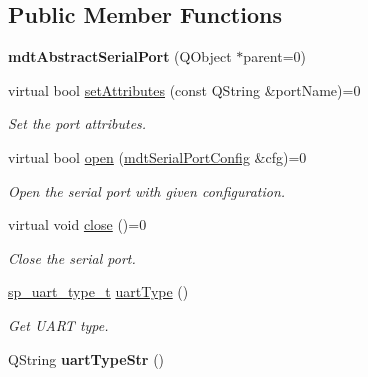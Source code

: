 \subsection*{Public Member Functions}
\begin{DoxyCompactItemize}
\item 
\hypertarget{classmdt_abstract_serial_port_ae379b6151edebc1518e81ec061e379db}{
{\bfseries mdtAbstractSerialPort} (QObject $\ast$parent=0)}
\label{classmdt_abstract_serial_port_ae379b6151edebc1518e81ec061e379db}

\item 
virtual bool \hyperlink{classmdt_abstract_serial_port_ae1be8d8778a7638649d5bb27a73297ef}{setAttributes} (const QString \&portName)=0
\begin{DoxyCompactList}\small\item\em Set the port attributes. \end{DoxyCompactList}\item 
virtual bool \hyperlink{classmdt_abstract_serial_port_ad96a99c370c87d7e4a8b47f98cc7ce35}{open} (\hyperlink{classmdt_serial_port_config}{mdtSerialPortConfig} \&cfg)=0
\begin{DoxyCompactList}\small\item\em Open the serial port with given configuration. \end{DoxyCompactList}\item 
virtual void \hyperlink{classmdt_abstract_serial_port_ad84810a4bd7a10c5c621475511196c85}{close} ()=0
\begin{DoxyCompactList}\small\item\em Close the serial port. \end{DoxyCompactList}\item 
\hypertarget{classmdt_abstract_serial_port_a6b153155d9e110336d51ec48d2cee203}{
\hyperlink{classmdt_abstract_serial_port_a56b107c57fb0acb17cfcca262abe6a54}{sp\_\-uart\_\-type\_\-t} \hyperlink{classmdt_abstract_serial_port_a6b153155d9e110336d51ec48d2cee203}{uartType} ()}
\label{classmdt_abstract_serial_port_a6b153155d9e110336d51ec48d2cee203}

\begin{DoxyCompactList}\small\item\em Get UART type. \end{DoxyCompactList}\item 
\hypertarget{classmdt_abstract_serial_port_a669c9ce68455abd3cfdb98259996e701}{
QString {\bfseries uartTypeStr} ()}
\label{classmdt_abstract_serial_port_a669c9ce68455abd3cfdb98259996e701}


\end{DoxyCompactItemize}
